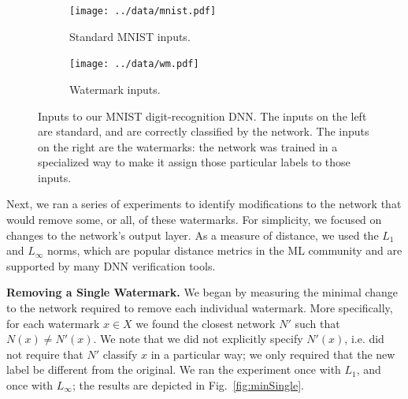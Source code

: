 \documentclass{easychair}
\begin{document}
\begin{figure}[htp]
  \centering
  \begin{subfigure}{0.4\linewidth}
    \texttt{[image: ../data/mnist.pdf]}
    \caption{Standard MNIST inputs.}
  \label{fig:mnistExample}
  \end{subfigure}
  \begin{subfigure}{0.4\linewidth}
    \texttt{[image: ../data/wm.pdf]}
     \caption{Watermark inputs.}
  \label{fig:noiseExample}
  \end{subfigure}
  \caption{Inputs to our MNIST digit-recognition DNN. The inputs on the
  left are standard, and are correctly classified by the network. The
  inputs on the right are the watermarks: the network was trained in a
  specialized way to make it assign those particular labels to those inputs.}
\label{fig:inputExample}
\end{figure}

Next, we ran a series of experiments to identify modifications to the
network that would remove some, or all, of these watermarks. For
simplicity, we
focused on changes to the network's output layer. As a measure of
distance, we used the $L_1$ and $L_\infty$ norms, which are popular
distance metrics in the ML community and are supported by many DNN
verification tools.

\medskip\noindent \textbf{Removing a Single Watermark.}
We began by measuring the minimal change to the network required to
remove each individual watermark. More specifically, for each
watermark $x\in X$ we found the closest network $N'$ such that
$N(x)\neq N'(x)$. We note that we did not explicitly specify $N'(x)$,
i.e. did not require that $N'$ classify $x$ in a particular way; we
only required that the new label be different from the original. We
ran the experiment once with $L_1$, and once with $L_\infty$; the
results are depicted in Fig.~\ref{fig:minSingle}.
\end{document}
